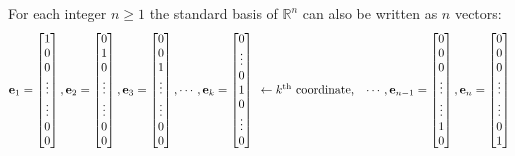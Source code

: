 \begin{remark}For each integer $n\geq 1$ the standard basis of $\mathbb{R}^n$ 
can also be written as $n$ vectors:
\[
\vec{e}_{1}=\begin{bmatrix} 1 \\  0 \\ 0 \\ \vdots \\ \vdots \\ 0 \\ 0\end{bmatrix},
\vec{e}_{2}=\begin{bmatrix} 0 \\  1 \\ 0 \\ \vdots \\ \vdots \\ 0 \\ 0\end{bmatrix},
\vec{e}_{3}=\begin{bmatrix} 0 \\  0 \\ 1 \\ \vdots \\ \vdots \\ 0 \\ 0\end{bmatrix},
\cdots,
\vec{e}_k=\begin{bmatrix} 0 \\  \vdots \\ 0 \\ 1 \\ 0 \\ \vdots \\ 0 \end{bmatrix}
\begin{array}{l}
\phantom{0} \\  \phantom{\vdots} \\ \phantom{0} \\ \gets k^{\tiny{\text{th}}} 
\text{ coordinate, } \\ \phantom{0} \\ \phantom{\vdots} \\ \phantom{0} 
\end{array} 
\cdots,
\vec{e}_{n-1}=\begin{bmatrix} 0 \\  0 \\ 0 \\ \vdots \\ \vdots \\ 1 \\ 0\end{bmatrix},
\vec{e}_{n}=\begin{bmatrix} 0 \\  0 \\ 0 \\ \vdots\\ \vdots \\ 0 \\ 1\end{bmatrix}
\]
\end{remark}
